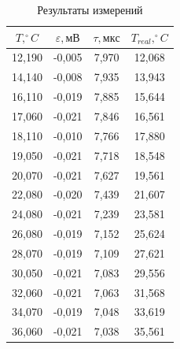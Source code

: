 \begin{table}[hbt]
\centering
\begin{tabular}{|c|c|c|c|}
\hline
\textbf{$T,   ^\circ C$} & \textbf{$\varepsilon, мВ$} & \textbf{$\tau, мкс$} & \textbf{$T_{real}, ^\circ C$} \\ \hline
12,190                   & -0,005                     & 7,970                & 12,068                        \\ \hline
14,140                   & -0,008                     & 7,935                & 13,943                        \\ \hline
16,110                   & -0,019                     & 7,885                & 15,644                        \\ \hline
17,060                   & -0,021                     & 7,846                & 16,561                        \\ \hline
18,110                   & -0,010                     & 7,766                & 17,880                        \\ \hline
19,050                   & -0,021                     & 7,718                & 18,548                        \\ \hline
20,070                   & -0,021                     & 7,627                & 19,561                        \\ \hline
22,080                   & -0,020                     & 7,439                & 21,607                        \\ \hline
24,080                   & -0,021                     & 7,239                & 23,581                        \\ \hline
26,080                   & -0,019                     & 7,152                & 25,624                        \\ \hline
28,070                   & -0,019                     & 7,109                & 27,621                        \\ \hline
30,050                   & -0,021                     & 7,083                & 29,556                        \\ \hline
32,060                   & -0,021                     & 7,063                & 31,568                        \\ \hline
34,070                   & -0,019                     & 7,048                & 33,619                        \\ \hline
36,060                   & -0,021                     & 7,038                & 35,561                        \\ \hline
\end{tabular}
\caption{Результаты измерений}
\end{table}
